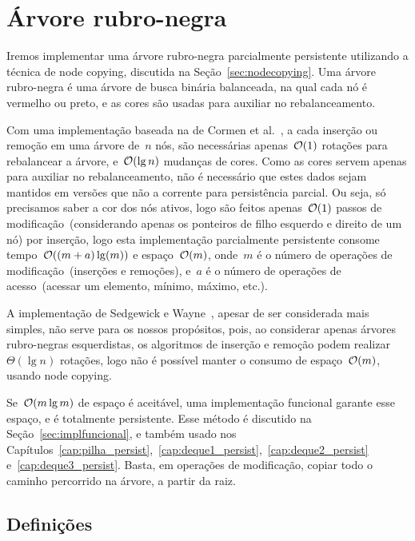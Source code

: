 \documentclass[main.tex]{subfiles}
\begin{document}
\chapter{Árvore rubro-negra} \label{cap:rubronegra_persist}

Iremos implementar uma árvore rubro-negra parcialmente persistente utilizando a técnica de node copying, discutida na Seção~\ref{sec:nodecopying}. Uma árvore rubro-negra é uma árvore de busca binária balanceada, na qual cada nó é vermelho ou preto, e as cores são usadas para auxiliar no rebalanceamento.

Com uma implementação baseada na de Cormen et al.~\cite[Cap. 13]{CLRS}, a cada inserção ou remoção em uma árvore de~$n$ nós, são necessárias apenas~$\mathcal{O}(1)$ rotações para rebalancear a árvore, e~$\mathcal{O}(\lg n)$ mudanças de cores. Como as cores servem apenas para auxiliar no rebalanceamento, não é necessário que estes dados sejam mantidos em versões que não a corrente para persistência parcial. Ou seja, só precisamos saber a cor dos nós ativos, logo são feitos apenas~$\mathcal{O}(1)$ passos de modificação~(considerando apenas os ponteiros de filho esquerdo e direito de um nó) por inserção, logo esta implementação parcialmente persistente consome tempo~$\mathcal{O}((m + a) \lg(m))$ e espaço~$\mathcal{O}(m)$, onde~$m$ é o número de operações de modificação~(inserções e remoções), e~$a$ é o número de operações de acesso~(acessar um elemento, mínimo, máximo, etc.).

A implementação de Sedgewick e Wayne~\cite{SedgewickRedBlack}, apesar de ser considerada mais simples, não serve para os nossos propósitos, pois, ao considerar apenas árvores rubro-negras esquerdistas, os algoritmos de inserção e remoção podem realizar~$\Theta(\lg n)$ rotações, logo não é possível manter o consumo de espaço~$\mathcal{O}(m)$, usando node copying.

Se~$\mathcal{O}(m \lg m)$ de espaço é aceitável, uma implementação funcional garante esse espaço, e é totalmente persistente. Esse método é discutido na Seção~\ref{sec:implfuncional}, e também usado nos Capítulos~\ref{cap:pilha_persist},~\ref{cap:deque1_persist},~\ref{cap:deque2_persist} e~\ref{cap:deque3_persist}. Basta, em operações de modificação, copiar todo o caminho percorrido na árvore, a partir da raiz.

\section{Definições}

\end{document}
